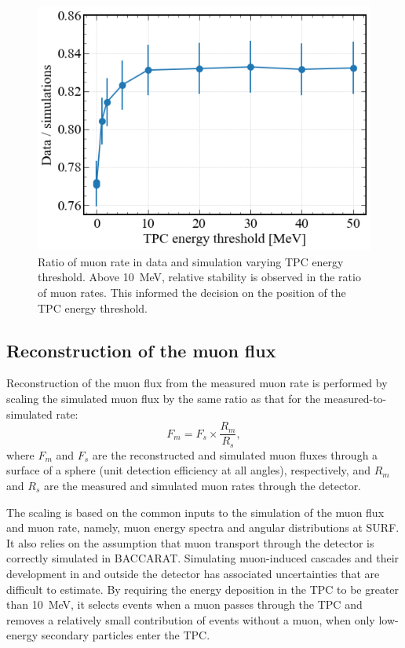 \begin{figure}[h!]
    \centering
    \includegraphics[width=0.7\linewidth]{figures/Muons/Data_sims_ratio_lgonly-2.pdf}
    \caption[Ratio of muon rate in data and simulation varying TPC energy threshold.]{Ratio of muon rate in data and simulation varying TPC energy threshold. Above 10~MeV, relative stability is observed in the ratio of muon rates. This informed the decision on the position of the TPC energy threshold.}
    \label{fig:Muons/MuonRatioByTPCThreshold}
\end{figure}


\subsection{Reconstruction of the muon flux}\label{sec:Muons/MuonFluxReconstruction}
Reconstruction of the muon flux from the measured muon rate is performed by scaling the simulated muon flux by the same ratio as that for the measured-to-simulated rate:
\begin{equation}
    F_{m} = F_{s} \times \frac{R_m}{R_s},
\label{eqn:Muons/flux}
\end{equation}
where $F_{m}$ and $F_{s}$ are the reconstructed and simulated muon fluxes through a surface of a sphere (unit detection efficiency at all angles), respectively, and $R_{m}$ and $R_{s}$ are the measured and simulated muon rates through the detector.

The scaling is based on the common inputs to the simulation of the muon flux and muon rate, namely, muon energy spectra and angular distributions at SURF. It also relies on the assumption that muon transport through the detector is correctly simulated in BACCARAT. Simulating muon-induced cascades and their development in and outside the detector has associated uncertainties that are difficult to estimate. By requiring the energy deposition in the TPC to be greater than 10~MeV, it selects events when a muon passes through the TPC and removes a relatively small contribution of events without a muon, when only low-energy secondary particles enter the TPC. 

